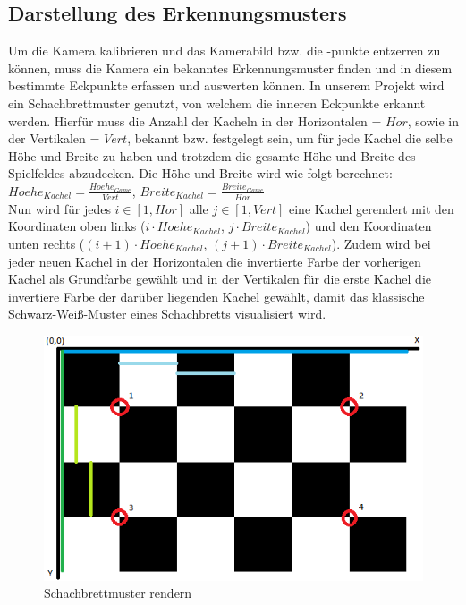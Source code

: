 \subsection{Darstellung des Erkennungsmusters}
Um die Kamera kalibrieren und das Kamerabild bzw. die -punkte entzerren zu können, muss die Kamera ein bekanntes Erkennungsmuster finden und in diesem bestimmte Eckpunkte erfassen und auswerten können. In unserem Projekt wird ein Schachbrettmuster genutzt, von welchem die inneren Eckpunkte erkannt werden. Hierfür muss die Anzahl der Kacheln in der Horizontalen = $Hor$, sowie in der Vertikalen = $Vert$, bekannt bzw. festgelegt sein, um für jede Kachel die selbe Höhe und Breite zu haben und trotzdem die gesamte Höhe und Breite des Spielfeldes abzudecken. Die Höhe und Breite wird wie folgt berechnet:\\
$Hoehe_{Kachel} = \frac{Hoehe_{Game}}{Vert}$, $Breite_{Kachel} = \frac{Breite_{Game}}{Hor}$\\
Nun wird für jedes $i \in [1,Hor]$ alle $j \in [1,Vert]$ eine Kachel gerendert mit den Koordinaten oben links ($i \cdot Hoehe_{Kachel}$, $j \cdot Breite_{Kachel}$) und den Koordinaten unten rechts ($(i+1) \cdot Hoehe_{Kachel}$, $(j+1) \cdot Breite_{Kachel}$). Zudem wird bei jeder neuen Kachel in der Horizontalen die invertierte Farbe der vorherigen Kachel als Grundfarbe gewählt und in der Vertikalen für die erste Kachel die invertiere Farbe der darüber liegenden Kachel gewählt, damit das klassische Schwarz-Weiß-Muster eines Schachbretts visualisiert wird.
\begin{figure}[h]
	\centering
	\includegraphics[scale=0.7]{bilder/schachbrett.png}
	\caption{Schachbrettmuster rendern}
\end{figure}

